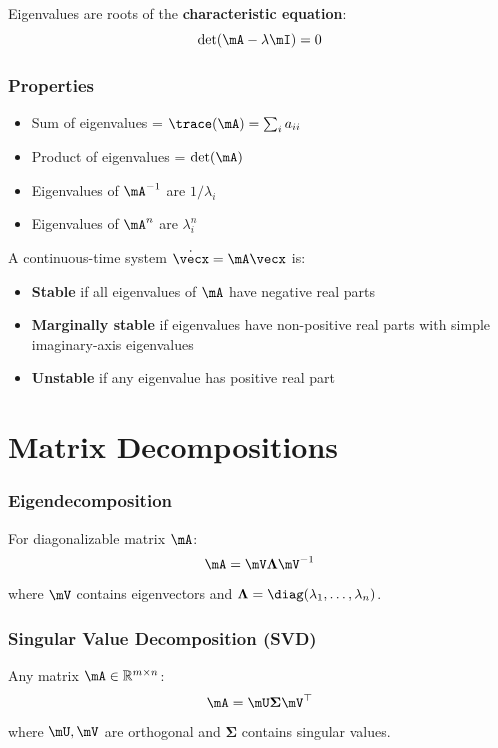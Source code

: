 Eigenvalues are roots of the \textbf{characteristic equation}:
\begin{equation}
\det(\mA - \lambda\mI) = 0
\end{equation}

\subsubsection{Properties}
\begin{itemize}
    \item Sum of eigenvalues = $\trace(\mA) = \sum_i a_{ii}$
    \item Product of eigenvalues = $\det(\mA)$
    \item Eigenvalues of $\mA^{-1}$ are $1/\lambda_i$
    \item Eigenvalues of $\mA^n$ are $\lambda_i^n$
\end{itemize}

\begin{keyconceptbox}[title=Stability and Eigenvalues]
A continuous-time system $\dot{\vecx} = \mA\vecx$ is:
\begin{itemize}
    \item \textbf{Stable} if all eigenvalues of $\mA$ have negative real parts
    \item \textbf{Marginally stable} if eigenvalues have non-positive real parts with simple imaginary-axis eigenvalues
    \item \textbf{Unstable} if any eigenvalue has positive real part
\end{itemize}
\end{keyconceptbox}

\section{Matrix Decompositions}

\subsubsection{Eigendecomposition}
For diagonalizable matrix $\mA$:
\begin{equation}
\mA = \mV\boldsymbol{\Lambda}\mV^{-1}
\end{equation}
where $\mV$ contains eigenvectors and $\boldsymbol{\Lambda} = \diag(\lambda_1, \ldots, \lambda_n)$.

\subsubsection{Singular Value Decomposition (SVD)}
Any matrix $\mA \in \mathbb{R}^{m \times n}$:
\begin{equation}
\mA = \mU\boldsymbol{\Sigma}\mV^\top
\end{equation}
where $\mU, \mV$ are orthogonal and $\boldsymbol{\Sigma}$ contains singular values.

